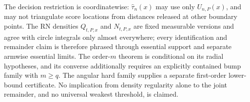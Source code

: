 The decision restriction is coordinatewise: \(\widehat\tau_n(x)\) may use only \(U_{n,P}(x)\), and may not triangulate score locations from distances released at other boundary points.  The RN densities \(Q_{t,P,x}\) and \(N_{t,P,x}\) are fixed measurable versions and agree with circle integrals only almost everywhere; every identification and remainder claim is therefore phrased through essential support and separate armwise essential limits.  The order-\(m\) theorem is conditional on its radial hypotheses, and its converse additionally requires an explicitly contained bump family with \(m\geq q\).  The angular hard family supplies a separate first-order lower-bound certificate.  No implication from density regularity alone to the joint remainder, and no universal weakest threshold, is claimed.